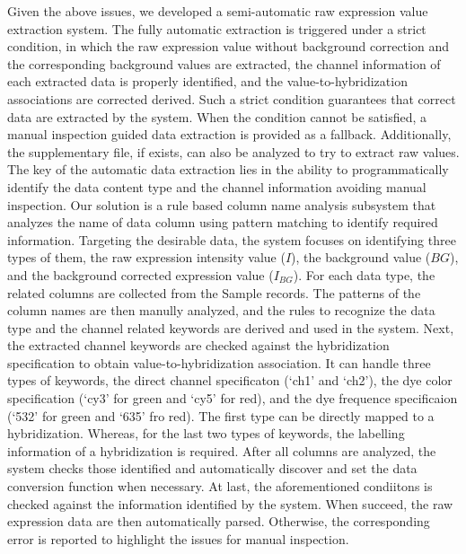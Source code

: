 Given the above issues, we developed a semi-automatic raw expression value
extraction system.
%
The fully automatic extraction is triggered under a strict condition, in which
the raw expression value without background correction and the corresponding
background values are extracted, the channel information of each extracted data
is properly identified, and the value-to-hybridization associations are
corrected derived.
%
Such a strict condition guarantees that correct data are extracted by the
system.
%
When the condition cannot be satisfied, a manual inspection guided data
extraction is provided as a fallback.  Additionally, the supplementary file, if
exists, can also be analyzed to try to extract raw values.
%
The key of the automatic data extraction lies in the ability to
programmatically identify the data content type and the channel information
avoiding manual inspection.
%
Our solution is a rule based column name analysis subsystem that analyzes the name
of data column using pattern matching to identify required information.
%
Targeting the desirable data, the system focuses on identifying three types of
them, the raw expression intensity value ($I$), the background value ($BG$),
and the background corrected expression value ($I_{BG}$).
%
For each data type, the related columns are collected from the Sample records.
The patterns of the column names are then manully analyzed, and the rules to
recognize the data type and the channel related keywords are derived and used
in the system.
%
Next, the extracted channel keywords are checked against the hybridization
specification to obtain value-to-hybridization association.
%
It can handle three types of keywords, the direct channel specificaton (`ch1'
and `ch2'), the dye color specification (`cy3' for green and `cy5' for red),
and the dye frequence specificaion (`532' for green and `635' fro red).
%
The first type can be directly mapped to a hybridization.  Whereas, for the
last two types of keywords, the labelling information of a hybridization is
required.
%
After all columns are analyzed, the system checks those identified and
automatically discover and set the data conversion function when necessary.
%
At last, the aforementioned condiitons is checked against the information
identified by the system.
%
When succeed, the raw expression data are then automatically parsed.
Otherwise, the corresponding error is reported to highlight the issues for
manual inspection.
%







